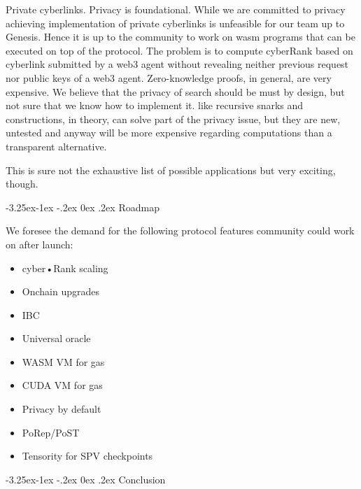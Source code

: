 \documentclass[8pt,oneside]{amsart}
\makeatletter
\newcommand{\linkgreen}[2]{\href{#1}{\color{green}{#2}}}
\renewcommand\subsection{\@startsection{subsection}{2}{\z@}%
                                     {-3.25ex\@plus -1ex \@minus -.2ex}%
                                     {0ex \@plus .2ex}%
                                     {\play\Large}}%
\newcommand{\titleSection}[1]{\subsection{#1}}
\newcommand{\code}[1]{{\PlayBold #1}}
\makeatother
\begin{document}
\code{Private cyberlinks}. Privacy is foundational. While we are committed to privacy achieving implementation of private cyberlinks is unfeasible for our team up to Genesis. Hence it is up to the community to work on wasm programs that can be executed on top of the protocol. The problem is to compute cyberRank based on cyberlink submitted by a web3 agent without revealing neither previous request nor public keys of a web3 agent. Zero-knowledge proofs, in general, are very expensive. We believe that the privacy of search should be must by design, but not sure that we know how to implement it. \linkgreen{https://ipfs.io/ipfs/Qmdje3AmtsfjX9edWAxo3LFhV9CTAXoUvwGR7wHJXnc2Gk}{Coda} like recursive snarks and \linkgreen{https://ipfs.io/ipfs/Qmd99xmraYip9cVv8gRMy6Y97Bkij8qUYArGDME7CzFasg}{mimblewimble} constructions, in theory, can solve part of the privacy issue, but they are new, untested and anyway will be more expensive regarding computations than a transparent alternative.

This is sure not the exhaustive list of possible applications but very exciting, though.

\titleSection{Roadmap}\label{Roadmap}

We foresee the demand for the following protocol features community could work on after launch:

\begin{itemize}
\item cyber•Rank scaling
\item Onchain upgrades
\item IBC
\item Universal oracle
\item WASM VM for gas
\item CUDA VM for gas
\item Privacy by default
\item PoRep/PoST
\item Tensority for SPV checkpoints

\end{itemize}

\titleSection{Conclusion}\label{Conclusion}
\end{document}
